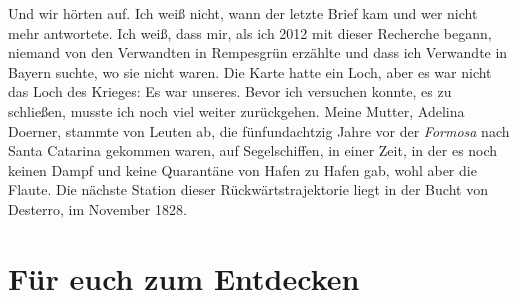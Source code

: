 \documentclass[
  ngerman,
  11pt,
  openany]{book}
\begin{document}
Und wir hörten auf. Ich weiß nicht, wann der letzte Brief kam und wer
nicht mehr antwortete. Ich weiß, dass mir, als ich 2012 mit dieser
Recherche begann, niemand von den Verwandten in Rempesgrün erzählte und
dass ich Verwandte in Bayern suchte, wo sie nicht waren. Die Karte hatte
ein Loch, aber es war nicht das Loch des Krieges: Es war unseres. Bevor
ich versuchen konnte, es zu schließen, musste ich noch viel weiter
zurückgehen. Meine Mutter, Adelina Doerner, stammte von Leuten ab, die
fünfundachtzig Jahre vor der \emph{Formosa} nach Santa Catarina gekommen
waren, auf Segelschiffen, in einer Zeit, in der es noch keinen Dampf und
keine Quarantäne von Hafen zu Hafen gab, wohl aber die Flaute. Die
nächste Station dieser Rückwärtstrajektorie liegt in der Bucht von
Desterro, im November 1828.

\section{Für euch zum Entdecken}\label{fuxfcr-euch-zum-entdecken-6}
\end{document}
